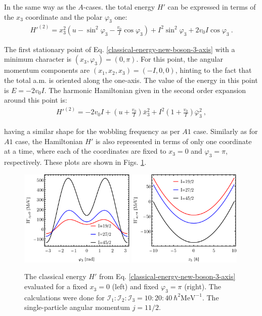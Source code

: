 In the same way as the $A$-cases. the total energy $H'$ can be expressed in terms of the $x_3$ coordinate and the polar $\varphi_3$ one:
\begin{align}
    H'^{(2)}=x_3^2\left(u-\sin^2\varphi_3-\frac{v_0}{I}\cos\varphi_3\right)+I^2\sin^2\varphi_3+2v_0I\cos\varphi_3\ .
    \label{classical-energy-new-boson-3-axis}
\end{align}

The first stationary point of Eq. \ref{classical-energy-new-boson-3-axis} with a minimum character is $(x_3,\varphi_3)=(0,\pi)$. For this point, the angular momentum components are $(x_1,x_2,x_3)=(-I,0,0)$, hinting to the fact that the total a.m. is oriented along the one-axis. The value of the energy in this point is $E=-2v_0I$. The harmonic Hamiltonian given in the second order expansion around this point is:
\begin{align}
    H'^{(2)}=-2v_0I+\left(u+\frac{v_0}{I}\right)\bar{x}_3^2+I^2\left(1+\frac{v_0}{I}\right)\bar{\varphi}_3^2\ ,
\end{align}

having a similar shape for the wobbling frequency as per $A1$ case. Similarly as for $A1$ case, the Hamiltonian $H'$ is also represented  in terms of only one coordinate at a time, where each of the coordinates are fixed to $x_3=0$ and $\varphi_3=\pi$, respectively. These plots are shown in Figs. \ref{energy-function-comparison-b1-case}.
\begin{figure}
    \centering
    \includegraphics[width=0.49\textwidth]{Chapters/Figures/Energy-Function-New-Boson-B1-x3-const.pdf}
    \includegraphics[width=0.49\textwidth]{Chapters/Figures/Energy-Function-New-Boson-B1-phi3-const.pdf}
    \caption{The classical energy $H'$ from Eq. \ref{classical-energy-new-boson-3-axis} evaluated for a fixed $x_3=0$ (left) and fixed $\varphi_3=\pi$ (right). The calculations were done for $\mathcal{I}_1:\mathcal{I}_2:\mathcal{I}_3=10:20:40\ \hbar^2\text{MeV}^{-1}$. The single-particle angular momentum $j=11/2$.}
    \label{energy-function-comparison-b1-case}
\end{figure}

